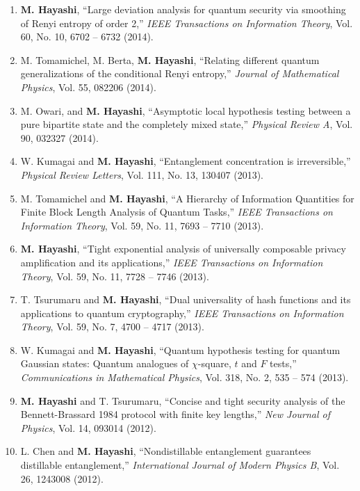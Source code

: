 \documentclass[a4paper,12pt,oneside]{article}
\begin{document}
\begin{enumerate}
\item 
\textbf{M. Hayashi}, 
``Large deviation analysis for quantum security via smoothing of Renyi entropy of order 2,'' 
{\em IEEE Transactions on Information Theory},
 Vol. 60,  No. 10, 6702 -- 6732 (2014).

\item 
M. Tomamichel, M. Berta, \textbf{M. Hayashi},
``Relating different quantum generalizations of the conditional
Renyi entropy,'' 
{\em Journal of Mathematical Physics}, Vol. 55, 082206 (2014).

\item 
M. Owari, and \textbf{M. Hayashi},
``Asymptotic local hypothesis testing between a pure bipartite state and the
completely mixed state,''
{\em Physical Review A}, Vol. 90, 032327 (2014).

\item W. Kumagai and \textbf{M. Hayashi}, 
``Entanglement concentration is irreversible,''
{\em Physical Review Letters}, Vol. 111, No. 13, 130407 (2013).

\item M. Tomamichel and \textbf{M. Hayashi}, 
``A Hierarchy of Information Quantities for Finite Block Length Analysis of Quantum Tasks,''
{\em IEEE Transactions on Information Theory},
 Vol. 59,  No. 11, 7693 -- 7710 (2013).

\item 
\textbf{M. Hayashi}, 
``Tight exponential analysis of universally composable privacy amplification and its applications,''
{\em IEEE Transactions on Information Theory},
 Vol. 59,  No. 11, 7728 -- 7746 (2013).

\item T. Tsurumaru and \textbf{M. Hayashi}, 
``Dual universality of hash functions and its applications to quantum cryptography,''
{\em IEEE Transactions on Information Theory},
Vol. 59, No. 7, 4700 -- 4717 (2013). 

\item W. Kumagai and \textbf{M. Hayashi}, 
``Quantum hypothesis testing for quantum Gaussian states: Quantum analogues of $\chi$-square, $t$ and $F$ tests,''  {\em Communications in Mathematical Physics}, Vol. 318, No. 2, 535 -- 574 (2013). 

\item \textbf{M. Hayashi} and T. Tsurumaru, 
``Concise and tight security analysis of the Bennett-Brassard 1984 protocol with finite key lengths,'' 
{\em New Journal of Physics}, Vol. 14, 093014 (2012).

\item L. Chen and \textbf{M. Hayashi}, 
``Nondistillable entanglement guarantees distillable entanglement,''
{\em International Journal of Modern Physics B}, Vol. 26, 1243008 (2012).


\end{enumerate}
\end{document}

